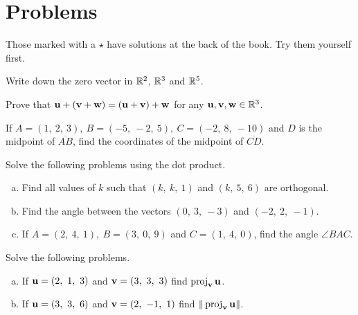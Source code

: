    
\section*{Problems}

Those marked with a $\star$ have solutions at the back of the book. Try them yourself first.

\begin{prob}
\label{prob02.1}
Write down the zero vector in $\mathbb{R}^2$, $\mathbb{R}^3$ and $\mathbb{R}^5$.
\end{prob}

\begin{prob}
\label{prob02.2}
Prove that $\mathbf{u} + (\mathbf{v} + \mathbf{w}) = (\mathbf{u} + \mathbf{v}) + \mathbf{w}$ for any $\mathbf{u},\mathbf{v},\mathbf{w}\in\mathbb{R}^3$.
\end{prob}
 

\begin{prob}
\label{prob02.3}\sov If $A=(1,\ 2,\ 3),\ B=(-5,\ -2,\ 5),\ C=(-2,\ 8,\ -10)$
and $D$ is the midpoint of $\overline{AB}$, find the coordinates of the
midpoint of $\overline{CD}$.

\end{prob}
\begin{prob}
\label{prob02.4} Solve the following problems using the dot product.\medskip
\begin{enumerate}[a)]



\item  Find all values of $k$ such that $(k,\ k,\ 1)$ and $(k,\ 5,\
6)$ are orthogonal.  \medskip
\item\sov Find the angle between the vectors $ (0,\ 3,\ -3)$
and $ (-2,\ 2,\ -1)$.  \medskip
\item If $A=(2,\ 4,\ 1),\ B=(3,\ 0,\ 9)$ and $C=(1,\ 4,\
0)$, find the angle $ \angle BAC$.  \medskip




\end{enumerate}




\end{prob}
\begin{prob}
\label{prob02.5}\sov  Solve the following problems. \medskip
\begin{enumerate}[a)]

\item If $\mathbf{u}=(2,\ 1,\ 3)$ and $\mathbf{v}=(3,\ 3,\ 3)$ find
 $\operatorname{proj}_{\mathbf{v}}{\mathbf{u}}$.  \medskip
\item   If $\mathbf{u}=(3,\ 3,\ 6)$ and $\mathbf{v}=(2,\ -1,\ 1)$ find
$\|\operatorname{proj}_{\mathbf{v}}{\mathbf{u}}\|$. \medskip
\end{enumerate}

\end{prob}



 

 
 